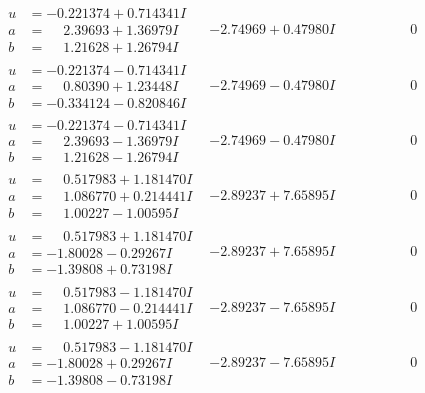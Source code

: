 \documentclass[1p]{elsarticle_modified}
\theoremstyle{definition}
\begin{document}
$$\begin{array}{c|c|c}
\begin{aligned}
u &= -0.221374 + 0.714341 I \\
a &= \phantom{-}2.39693 + 1.36979 I \\
b &= \phantom{-}1.21628 + 1.26794 I\end{aligned}
 & -2.74969 + 0.47980 I & \phantom{-0.000000 } 0 \\ \hline\begin{aligned}
u &= -0.221374 - 0.714341 I \\
a &= \phantom{-}0.80390 + 1.23448 I \\
b &= -0.334124 - 0.820846 I\end{aligned}
 & -2.74969 - 0.47980 I & \phantom{-0.000000 } 0 \\ \hline\begin{aligned}
u &= -0.221374 - 0.714341 I \\
a &= \phantom{-}2.39693 - 1.36979 I \\
b &= \phantom{-}1.21628 - 1.26794 I\end{aligned}
 & -2.74969 - 0.47980 I & \phantom{-0.000000 } 0 \\ \hline\begin{aligned}
u &= \phantom{-}0.517983 + 1.181470 I \\
a &= \phantom{-}1.086770 + 0.214441 I \\
b &= \phantom{-}1.00227 - 1.00595 I\end{aligned}
 & -2.89237 + 7.65895 I & \phantom{-0.000000 } 0 \\ \hline\begin{aligned}
u &= \phantom{-}0.517983 + 1.181470 I \\
a &= -1.80028 - 0.29267 I \\
b &= -1.39808 + 0.73198 I\end{aligned}
 & -2.89237 + 7.65895 I & \phantom{-0.000000 } 0 \\ \hline\begin{aligned}
u &= \phantom{-}0.517983 - 1.181470 I \\
a &= \phantom{-}1.086770 - 0.214441 I \\
b &= \phantom{-}1.00227 + 1.00595 I\end{aligned}
 & -2.89237 - 7.65895 I & \phantom{-0.000000 } 0 \\ \hline\begin{aligned}
u &= \phantom{-}0.517983 - 1.181470 I \\
a &= -1.80028 + 0.29267 I \\
b &= -1.39808 - 0.73198 I\end{aligned}
 & -2.89237 - 7.65895 I & \phantom{-0.000000 } 0 \\ \hline\begin{aligned}

\end{aligned}
\end{array}$$
\end{document}
